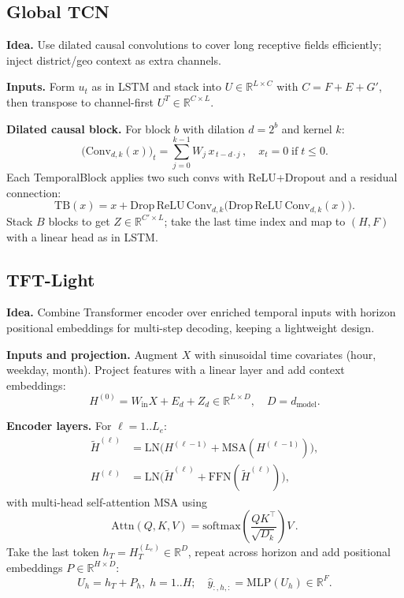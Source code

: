 \documentclass[12pt,a4paper]{article}
\begin{document}
\subsection{Global TCN}
\textbf{Idea.} Use dilated causal convolutions to cover long receptive fields efficiently; inject district/geo context as extra channels.

\noindent\textbf{Inputs.} Form $u_t$ as in LSTM and stack into $U\in\mathbb{R}^{L\times C}$ with $C=F+E+G'$, then transpose to channel-first $U^T\in\mathbb{R}^{C\times L}$.

\noindent\textbf{Dilated causal block.} For block $b$ with dilation $d=2^b$ and kernel $k$:
\[
\big(\mathrm{Conv}_{d,k}(x)\big)_t = \sum_{j=0}^{k-1} W_j\, x_{\,t - d\cdot j}\,,\quad x_t=0\;\text{if}\; t\le 0.\]
Each TemporalBlock applies two such convs with ReLU+Dropout and a residual connection:
\[
\mathrm{TB}(x) = x + \mathrm{Drop}\,\mathrm{ReLU}\,\mathrm{Conv}_{d,k}\big(\mathrm{Drop}\,\mathrm{ReLU}\,\mathrm{Conv}_{d,k}(x)\big).
\]
Stack $B$ blocks to get $Z\in\mathbb{R}^{C'\times L}$; take the last time index and map to $(H,F)$ with a linear head as in LSTM.

\subsection{TFT-Light}
\textbf{Idea.} Combine Transformer encoder over enriched temporal inputs with horizon positional embeddings for multi-step decoding, keeping a lightweight design.

\noindent\textbf{Inputs and projection.} Augment $X$ with sinusoidal time covariates (hour, weekday, month). Project features with a linear layer and add context embeddings:
\[
H^{(0)} = W_{\text{in}} X + E_d + Z_d\in\mathbb{R}^{L\times D},\quad D=d_{\text{model}}.
\]

\noindent\textbf{Encoder layers.} For $\ell=1..L_e$:
\begin{align*}
\widetilde{H}^{(\ell)} &= \mathrm{LN}\big(H^{(\ell-1)} + \mathrm{MSA}(H^{(\ell-1)})\big),\\
H^{(\ell)} &= \mathrm{LN}\big(\widetilde{H}^{(\ell)} + \mathrm{FFN}(\widetilde{H}^{(\ell)})\big),
\end{align*}
with multi-head self-attention $\mathrm{MSA}$ using
\[
\mathrm{Attn}(Q,K,V) = \mathrm{softmax}\!\left( \frac{QK^\top}{\sqrt{D_k}} \right) V\,.
\]
Take the last token $h_T = H^{(L_e)}_{T}\in\mathbb{R}^{D}$, repeat across horizon and add positional embeddings $P\in\mathbb{R}^{H\times D}$:
\[
U_h = h_T + P_h,\; h=1..H; \quad \widehat{y}_{:,h,:} = \mathrm{MLP}(U_h)\in\mathbb{R}^{F}.
\]
\end{document}
